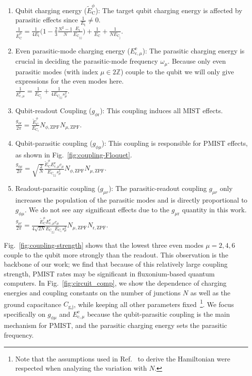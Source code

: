 \documentclass[%
reprint,
superscriptaddress,
 amsmath,amssymb,
 aps,
 prx,
longbibliography,
floatfix,
]{revtex4-2}
\begin{document}
\begin{enumerate}
    \item Qubit charging energy ($\tilde{E}_\textrm{C}^\phi$): The target qubit charging energy is affected by parasitic effects since $\frac{1}{E_\textrm{t}}\neq 0$.\\ $\frac{1}{\bar{E}_\textrm{C}^\phi}=\frac{1}{4E_{\textrm{t}}}\Big(1-\frac{2}{3}\frac{N^2-1}{N}\frac{E_{\textrm{t}}}{E_{\textrm{C}_\textrm{g,j}}}\Big)+\frac{1}{E_{\textrm{C}}}+\frac{1}{NE_{\textrm{C}_\textrm{j}}}$.
    \item Even parasitic-mode charging energy ($E_{\textrm{c},\mu}^\textrm{e}$): The parasitic charging energy is crucial in deciding the parasitic-mode frequency $\omega_{\mu}$. Because only even parasitic modes (with index $\mu\in 2\mathbb{Z}$) couple to the qubit we will only give expressions for the even modes here.\\ $\frac{1}{E_{\textrm{c},\mu}^{e}}=\frac{1}{E_{\textrm{C}_\textrm{j}}}+\frac{1}{4E_{\textrm{C}_\textrm{g,j}}s_\mu^2}.$ 
    \item Qubit-readout Coupling ($g_{\phi \textrm{r}}$):  This coupling induces all MIST effects.\\ $\frac{g_{\phi \textrm{r}}}{2\pi}=\frac{\tilde{E}_\textrm{C}^\phi}{E_{\textrm{C}_\textrm{c}}} N_{\phi,\mathrm{ZPF}}N_{\mu,\mathrm{ZPF}}.$
    \item Qubit-parasitic coupling ($g_{\phi\mu}$): This coupling is responsible for PMIST effects, as shown in Fig.~\ref{fig:coupling-Floquet}.\\ $\frac{g_{\phi\mu}}{2\pi}=\sqrt{\frac{2}{N}} \frac{\tilde{E}^\phi_\textrm{C}E^\textrm{e}_{\textrm{c},\mu}c_\mu}{E_{\textrm{C}_\textrm{g,j}}s_\mu^2} N_{\phi,\mathrm{ZPF}} N_{\mu,\mathrm{ZPF}}.$
    \item Readout-parasitic coupling ($g_{\mu r}$): The parasitic-readout coupling $g_{\mu r}$ only increases the population of the parasitic modes and is directly proportional to $g_{\phi\mu}$. We do not see any significant effects due to the $g_{\mu \textrm{r}}$ quantity in this work.\\ $\frac{g_{\mu r}}{2\pi}=\frac{\tilde{E}^\phi_\textrm{C}E^\textrm{e}_{\textrm{c},\mu}c_\mu}{4\sqrt{2N}E_{\textrm{C}_\textrm{g,j}}E_{\textrm{C}_\textrm{c}}s_\mu^2} N_{\mu,\mathrm{ZPF}}N_{\textrm{r},\mathrm{ZPF}}.$   
    \end{enumerate}
    Fig.~\ref{fig:coupling-strength} shows that the lowest three even modes $\mu=2,4,6$ couple to the qubit more strongly than the readout. This observation is the backbone of our work; we find that because of this relatively large coupling strength, PMIST rates may be significant in fluxonium-based quantum computers. In Fig.~\ref{fig:circuit_comp}, we show the dependence of charging energies and coupling constants on the number of junctions $N$ as well as the ground capacitance $C_\textrm{g,j}$, while keeping all other parameters fixed~\footnote{Note that the assumptions used in Ref.~\cite{viola2015collective} to derive the Hamiltonian were respected when analyzing the variation with $N$.}. We focus specifically on $g_{\phi\mu}$ and $E_{\textrm{c},\mu}^\textrm{e}$ because the qubit-parasitic coupling is the main mechanism for PMIST, and the parasitic charging energy sets the parasitic frequency.
\end{document}
